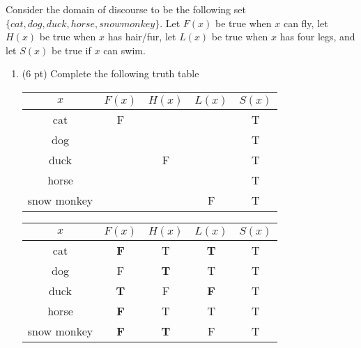\begin{questions}

  Consider the domain of discourse to be the following set $ \{ cat, dog, duck, horse, snow monkey \}$.  Let $F(x)$ be true when $x$ can fly, let $H(x)$ be true when $x$ has hair/fur, let $L(x)$ be true when $x$ has four legs, and let $S(x)$ be true if $x$ can swim. 

\begin{enumerate}[label=(\alph*)]
  \item (6 pt) Complete the following truth table

  \ifprintanswers
  \else
  \hspace*{0.5in}\begin{tabular}{|c|c|c|c|c|}
    \hline
      $x$ & $F(x)$ & $H(x)$ & $L(x)$ & \hspace*{0.1in}$S(x)$ \hspace*{0.1in}\\
    \hline
      cat   &  F & \hspace*{0.5in} & \hspace*{0.5in} & T \\
    \hline
      dog   & \hspace*{0.5in}  & & & T \\
    \hline
      duck  &  & F & & T \\
    \hline
      horse &  & &  & T \\
    \hline
      snow monkey &  & & F & T \\
    \hline
  \end{tabular}
  \fi
    \begin{solution}
      \begin{tabular}{|c|c|c|c|c|}
        \hline
          $x$ & $F(x)$ & $H(x)$ & $L(x)$ & \hspace*{0.15in} $S(x)$ \hspace*{0.15in} \\
        \hline
          cat   & \textbf{F} & T & \textbf{T} & T \\
        \hline
          dog   & F & \textbf{T} & T & T \\
        \hline
          duck  & \textbf{T} & F & \textbf{F} & T \\
        \hline
          horse & \textbf{F} & T & T & T \\
        \hline
          snow monkey & \textbf{F} & \textbf{T} & F & T \\
        \hline
      \end{tabular}
    \end{solution}


\end{enumerate}
\end{questions}
